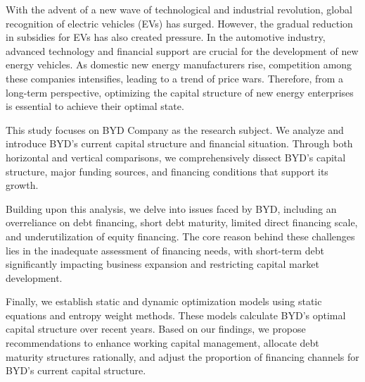 \begin{abstract*}
With the advent of a new wave of technological and industrial revolution, global recognition of electric vehicles (EVs) has surged. However, the gradual reduction in subsidies for EVs has also created pressure. In the automotive industry, advanced technology and financial support are crucial for the development of new energy vehicles. As domestic new energy manufacturers rise, competition among these companies intensifies, leading to a trend of price wars. Therefore, from a long-term perspective, optimizing the capital structure of new energy enterprises is essential to achieve their optimal state.

This study focuses on BYD Company as the research subject. We analyze and introduce BYD’s current capital structure and financial situation. Through both horizontal and vertical comparisons, we comprehensively dissect BYD’s capital structure, major funding sources, and financing conditions that support its growth.

Building upon this analysis, we delve into issues faced by BYD, including an overreliance on debt financing, short debt maturity, limited direct financing scale, and underutilization of equity financing. The core reason behind these challenges lies in the inadequate assessment of financing needs, with short-term debt significantly impacting business expansion and restricting capital market development.

Finally, we establish static and dynamic optimization models using static equations and entropy weight methods. These models calculate BYD’s optimal capital structure over recent years. Based on our findings, we propose recommendations to enhance working capital management, allocate debt maturity structures rationally, and adjust the proportion of financing channels for BYD’s current capital structure.
\end{abstract*}
